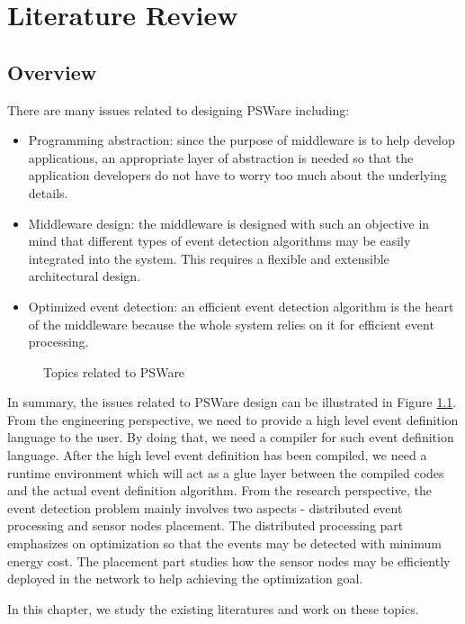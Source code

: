 \chapter{Literature Review}
\label{chapter:literature}
\section{Overview}
There are many issues related to designing PSWare including:
\begin{itemize}
\item Programming abstraction: since the purpose of middleware is to help develop applications, an appropriate layer of abstraction is needed so that the application developers do not have to worry too much about the underlying details.
\item Middleware design: the middleware is designed with such an objective in mind that different types of event detection algorithms may be easily integrated into the system. This requires a flexible and extensible architectural design.
\item Optimized event detection: an efficient event detection algorithm is the heart of the middleware because the whole system relies on it for efficient event processing.
\end{itemize}

\begin{figure}
\centering
{}
\caption{Topics related to PSWare}
\label{fig:literature-overall}
\end{figure}

In summary, the issues related to PSWare design can be illustrated in Figure \ref{fig:literature-overall}. From the engineering perspective, we need to provide a high level event definition language to the user. By doing that, we need a compiler for such event definition language. After the high level event definition has been compiled, we need a runtime environment which will act as a glue layer between the compiled codes and the actual event definition algorithm. From the research perspective, the event detection problem mainly involves two aspects - distributed event processing and sensor nodes placement. The distributed processing part emphasizes on optimization so that the events may be detected with minimum energy cost. The placement part studies how the sensor nodes may be efficiently deployed in the network to help achieving the optimization goal.

In this chapter, we study the existing literatures and work on these topics.
